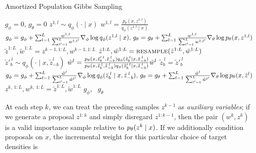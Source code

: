 \documentclass[anonymous=false, %
               format=acmsmall, %
               review=true, %
               screen=true, %
               nonacm=true]{acmart}
\theoremstyle{definition}
\begin{document}
\begin{algorithm}[!tb]
  \caption{Amortized Population Gibbs Sampling}
  \label{alg:amortized-gibbs}
\begin{algorithmic}[1]
\small
  \State $g_\phi = 0, \, g_\theta = 0$\label{line:init-grad}
  \label{line:rws-loop}
      \State $z^{1,l} \sim q_\phi(\cdot \mid x)$\label{line:rws-propose}
      \State $w^{1,l} = \frac{p_\theta(x, z^{1,l})}{q_\phi(z^{1,l} \mid x)}$\label{line:rws-weight}
  \EndFor
  \State $g_\phi = g_\phi + \sum_{l = 1}^L \frac{w^{1,l}}{\sum_{l' = 1}^L w^{1,l'}} \nabla_\phi \log q_\phi(z^{1,l} \mid x)
  , 
  \,
  g_\theta = g_\theta + \sum_{l = 1}^L \frac{w^{1,l}}{\sum_{l' = 1}^L w^{1,l'}} \nabla_\theta \log p_\theta(x, z^{1,l})$\label{line:rws-grad}
  \label{line:sweep-loop}
    \State $\tilde{z}^{1:L}, \tilde{w}^{1:L} = z^{k-1,1:L}, w^{k-1,1:L}$ \label{line:apg-sweep-begin}
    \label{line:block-loop}
      \State $\tilde{z}^{1:L}, \tilde{w}^{1:L}=\textsc{resample}(\tilde{z}^{1:L}, \tilde{w}^{1:L})$\label{line:resample} 
        \label{line:apg-sample-loop}
          \State $\tilde{z}'^{\:l}_b \sim q_\phi(\cdot \mid x, \tilde{z}_{-b}^l)$\label{line:apg-propose}
          \State \label{line:apg-weight} $\tilde{w}^l = \frac{p_\theta(x, \tilde{z}'^{\:l}_{b}, \tilde{z}^{\:l}_{-b}) q_\phi(\tilde{z}^{\:l}_b \mid x, \tilde{z}^{\:l}_{-b})}{p_\theta(x, \tilde{z}^{\:l}_b, \tilde{z}^{\:l}_{-b}) q_\phi(\tilde{z}'^{\:l}_b \mid x, \tilde{z}^{\:l}_{-b})}\tilde{w}^l$ 
          \State \label{line:apg-reassign}$\tilde{z}^{\:l}_b = \tilde{z}'^{\:l}_b$ 
      \EndFor
      \State $g_\phi=g_\phi+ \sum_{l = 1}^L\frac{\tilde{w}^l}{\sum_{l'= 1}^L \tilde{w}^{l'}} \nabla_\phi\log q_\phi(\tilde{z}^{\:l}_b \mid x, \tilde{z}^{\:l}_{-b})
      ,
      \,
      g_\theta = g_\theta + \sum_{l = 1}^L \frac{\tilde{w}^l}{\sum_{l' = 1}^L \tilde{w}^{l'}} \nabla_\theta \log p_\theta(x, \tilde{z}^l)
      $\label{line:apg-grad}
     \EndFor
     \State $z^{k,\:1:L}, w^{k,\:1:L} = \tilde{z}^{1:L}, \tilde{w}^{1:L}$\label{line:apg-sweep-end}
     \vspace{0.5em}
  \EndFor
  \Return $g_\phi$, \, $g_\theta$
\end{algorithmic}
\end{algorithm}
At each step $k$, we can treat the preceding samples $z^{k-1}$ as \emph{auxiliary variables}; if we generate a proposal $z^{1:k}$ and simply disregard $z^{1:k-1}$, then the pair $(w^k, z^k)$ is a valid importance sample relative to $p_\theta(z^k \mid x)$. If we additionally condition proposals on $x$, the incremental weight for this particular choice of target densities is
\end{document}
